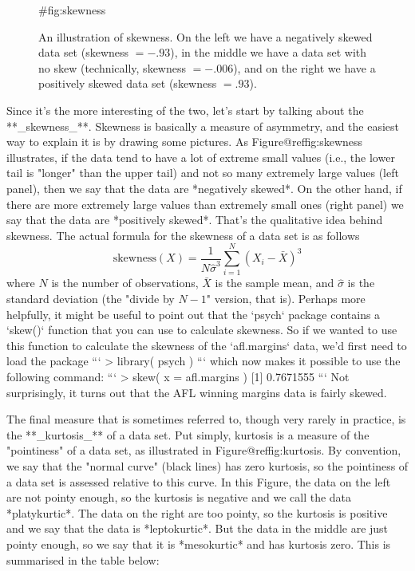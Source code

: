\begin{figure}[t]
\begin{center}
\caption{An illustration of skewness. On the left we have a negatively skewed data set (skewness $= -.93$), in the middle we have a data set with no skew (technically, skewness $= -.006$), and on the right we have a positively skewed data set (skewness $= .93$).  }
{#fig:skewness}
\HR
\end{center}
\end{figure}


Since it's the more interesting of the two, let's start by talking about the **_skewness_**. Skewness is basically a measure of asymmetry, and the easiest way to explain it is by drawing some pictures. As Figure@reffig:skewness illustrates, if the data tend to have a lot of extreme small values (i.e., the lower tail is "longer" than the upper tail) and not so many extremely large values (left panel), then we say that the data are *negatively skewed*. On the other hand, if there are more extremely large values than extremely small ones (right panel) we say that the data are *positively skewed*. That's the qualitative idea behind skewness. The actual formula for the skewness of a data set is as follows
$$
\mbox{skewness}(X) = \frac{1}{N \hat{\sigma}^3} \sum_{i=1}^N (X_i - \bar{X})^3
$$
where $N$ is the number of observations, $\bar{X}$ is the sample mean, and $\hat{\sigma}$ is the standard deviation (the "divide by $N-1$" version, that is). Perhaps more helpfully, it might be useful to point out that the `psych` package contains a `skew()` function that you can use to calculate skewness. So if we wanted to use this function to calculate the skewness of the `afl.margins` data, we'd first need to load the package
```
> library( psych )
```
which now makes it possible to use the following command:
```
> skew( x = afl.margins )
[1] 0.7671555
```
Not surprisingly, it turns out that the AFL winning margins data is fairly skewed.


The final measure that is sometimes referred to, though very rarely in practice, is the **_kurtosis_** of a data set. Put simply, kurtosis is a measure of the "pointiness" of a data set, as illustrated in Figure@reffig:kurtosis. By convention, we say that the "normal curve" (black lines) has zero kurtosis, so the pointiness of a data set is assessed relative to this curve. In this Figure, the data on the left are not pointy enough, so the kurtosis is negative and we call the data *platykurtic*. The data on the right are too pointy, so the kurtosis is positive and we say that the data is *leptokurtic*. But the data in the middle are just pointy enough, so we say that it is *mesokurtic* and has kurtosis zero. This is summarised in the table below:

